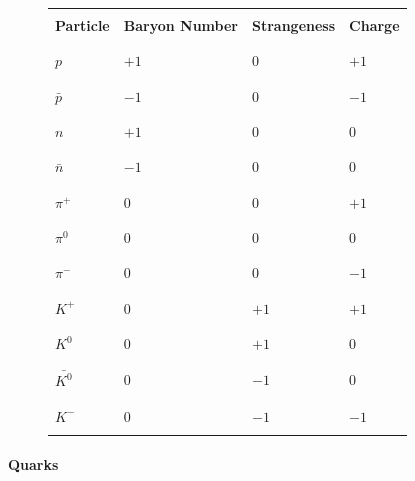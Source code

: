 \documentclass[12pt]{article}
\begin{document}
\begin{figure}[H]
\small
\begin{longtable}{ |C{0.2\textwidth}|C{0.2\textwidth}|C{0.2\textwidth}|C{0.2\textwidth}| }
\hline
&&&\\*
\textbf{Particle} & \textbf{Baryon Number} & \textbf{Strangeness} & \textbf{Charge} \\*
&&&\\*
\hline
\endhead
&&&\\*
$p$&$+1$&$0$&$+1$\\*
&&&\\*
\hline
&&&\\*
$\bar{p}$&$-1$&$0$&$-1$\\*
&&&\\*
\hline
&&&\\*
$n$&$+1$&$0$&$0$\\*
&&&\\*
\hline
&&&\\*
$\bar{n}$&$-1$&$0$&$0$\\*
&&&\\*
\hline
&&&\\*
$\pi ^+$&$0$&$0$&$+1$\\*
&&&\\*
\hline
&&&\\*
$\pi ^0$&$0$&$0$&$0$\\*
&&&\\*
\hline
&&&\\*
$\pi ^-$&$0$&$0$&$-1$\\*
&&&\\*
\hline
&&&\\*
$K^+$&$0$&$+1$&$+1$\\*
&&&\\*
\hline
&&&\\*
$K^0$&$0$&$+1$&$0$\\*
&&&\\*
\hline
&&&\\*
$\bar{K^0}$&$0$&$-1$&$0$\\*
&&&\\*
\hline
&&&\\*
$K^-$&$0$&$-1$&$-1$\\*
&&&\\*
\hline
\end{longtable}
\normalsize
\end{figure}

\paragraph{Quarks}
\label{sec:org10566ef}
\end{document}
